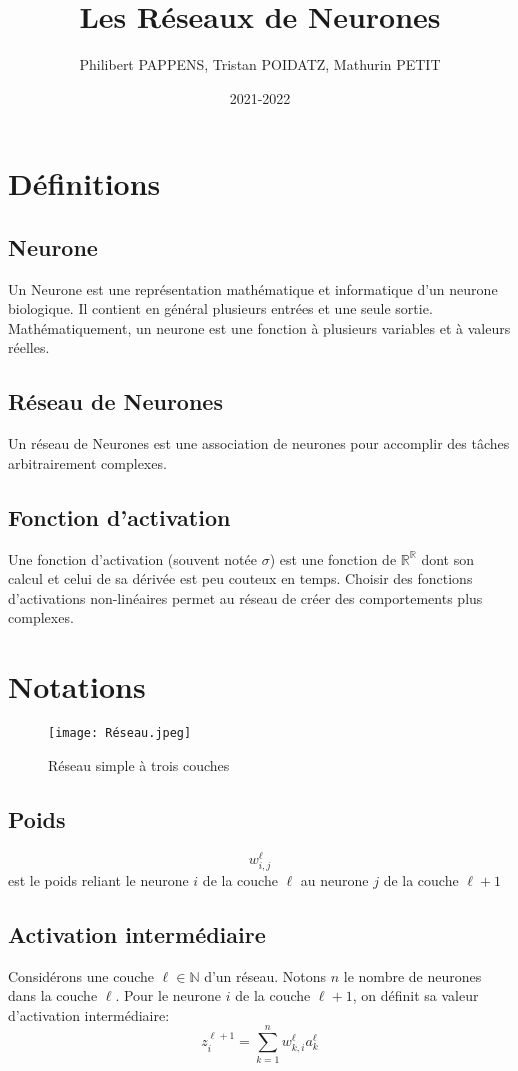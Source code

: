 \documentclass[10pt,a4paper,titlepage]{article}
\title{Les Réseaux de Neurones}
\author{Philibert PAPPENS, Tristan POIDATZ, Mathurin PETIT}
\date{2021-2022}
\begin{document}
\maketitle
\tableofcontents

\section{Définitions}
\subsection{Neurone}
Un Neurone est une représentation mathématique et informatique d'un neurone biologique. Il contient en général plusieurs entrées et une seule sortie.
Mathématiquement, un neurone est une fonction à plusieurs variables et à valeurs réelles.

\subsection{Réseau de Neurones}
Un réseau de Neurones est une association de neurones pour accomplir des tâches arbitrairement complexes.

\subsection{Fonction d'activation}
Une fonction d'activation (souvent notée $\sigma$) est une fonction de $\mathbb{R^R}$ dont son calcul et celui de sa dérivée est peu couteux en temps. Choisir des fonctions d'activations non-linéaires permet au réseau de créer des comportements plus complexes.

\section{Notations}
\begin{figure}[H]
	\texttt{[image: Réseau.jpeg]}
	\caption{Réseau simple à trois couches}
	\label{fig:Réseau}
\end{figure}

\subsection{Poids}
\[w_{i,j}^{\ell}\] est le poids reliant le neurone $i$ de la couche $\ell$ au neurone $j$ de la couche $\ell+1$

\subsection{Activation intermédiaire}
Considérons une couche $\ell \in \mathbb{N}$ d'un réseau. Notons $n$ le nombre de neurones dans la couche $\ell$.
Pour le neurone $i$ de la couche $\ell+1$, on définit sa valeur d'activation intermédiaire:
\begin{equation} 
\label{eq:1}
z_{i}^{\ell+1} = \sum_{k=1}^n{w_{k,i}^{\ell}a_k^{\ell}}
\end{equation}
\end{document}
